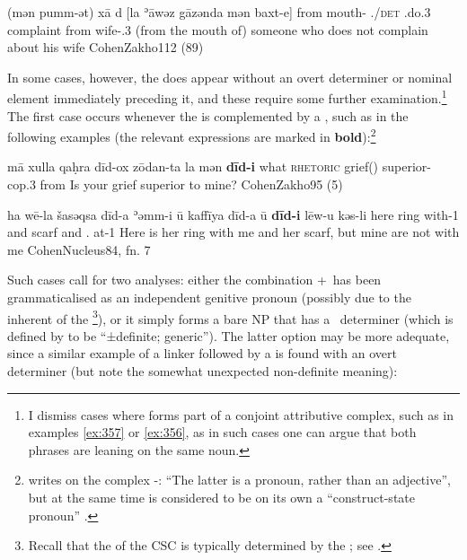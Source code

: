 {(mən pumm-ət) xā \opt{\zero}  d\cb{} [la ʾāwəz gāzənda mən baxt-e]}
{from mouth-\cst{} \indef.\pro/\textsc{det} \opt{\zero} \lnk\cb{} \neg{} \sbjv.do.3\masc{} complaint from wife-\poss.3\masc}
{(from the mouth of) someone who does not complain about his wife}
{CohenZakho}{112 (89)}

In some cases, however, the \lnk* does appear without an overt determiner or nominal element immediately preceding it, and these require some further examination.\footnote{I dismiss cases where  forms part of a conjoint attributive complex, such as in examples \vref{ex:357} or \vref{ex:356}, as in such cases one can argue that both  phrases are leaning on the same \prim noun.} The first case occurs whenever the \lnk* is complemented by a , such as in the following examples (the relevant expressions are marked in \textbf{bold}):\footnote{\citet[138]{CohenZakho} writes on the complex \lnk-\poss: \enquote{The latter is a pronoun, rather than an adjective}, but at the same time  is considered to be on its own a \enquote{construct-state pronoun} \citep[452]{CohenZakho}.}

{mā\cb{} xulla qaḥra dīd-ox zōdan-ta \cb{}la mən \zero{} \textbf{dīd-i}}
{what\cb{} \textsc{rhetoric} grief(\fem) \masc{} superior-\fem{} \cb{}cop.3\fem{} from \zero{} \sg{}}
{Is your grief superior to mine?}
{CohenZakho}{95 (5)}

{ha\cb{} wē-la šasəqsa dīd-a ʾəmm-i ū\cb{} kaffīya dīd-a ū\cb{} \zero{} \textbf{dīd-i} lēw-u kəs-li}
{here\cb{} \fem{} ring \fem{} with-1\sg{} and\cb{} scarf \fem{} and\cb{} \zero{} \sg{} \neg.\pl{} at-1\sg}
{Here is her ring with me and her scarf, but mine are not with me}
{CohenNucleus}{84, fn. 7}

Such cases call for two analyses: either the combination \lnkd+\poss\ has been  grammaticalised as an independent genitive pronoun (possibly due to the inherent  of the \footnote{Recall that the  of the  CSC is typically determined by the \secn; see .}), or it simply forms a bare NP that has a \zero\ determiner (which is defined by \citet[454]{CohenZakho} to be \enquote{±definite; generic}). The latter option may be more adequate, since a similar example of a linker followed by a  is found with an overt determiner (but note the somewhat unexpected non-definite meaning):


